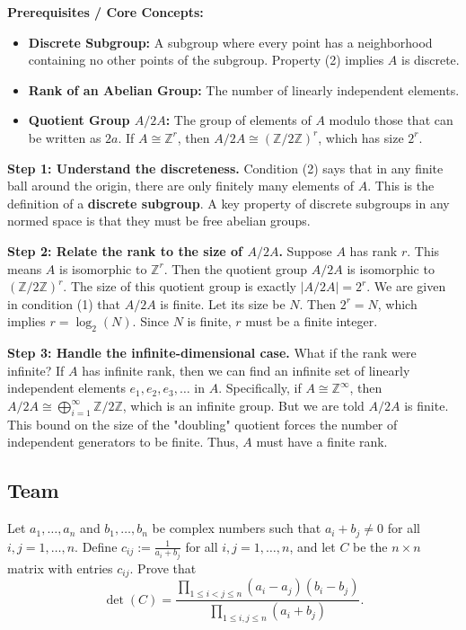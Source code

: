 \begin{solution}
\textbf{Prerequisites / Core Concepts:}
\begin{itemize}
    \item \textbf{Discrete Subgroup:} A subgroup where every point has a neighborhood containing no other points of the subgroup. Property (2) implies $A$ is discrete.
    \item \textbf{Rank of an Abelian Group:} The number of linearly independent elements.
    \item \textbf{Quotient Group $A/2A$:} The group of elements of $A$ modulo those that can be written as $2a$. If $A \cong \mathbb{Z}^r$, then $A/2A \cong (\mathbb{Z}/2\mathbb{Z})^r$, which has size $2^r$.
\end{itemize}

\textbf{Step 1: Understand the discreteness.}
Condition (2) says that in any finite ball around the origin, there are only finitely many elements of $A$. This is the definition of a \textbf{discrete subgroup}.
A key property of discrete subgroups in any normed space is that they must be free abelian groups. 

\textbf{Step 2: Relate the rank to the size of $A/2A$.}
Suppose $A$ has rank $r$. This means $A$ is isomorphic to $\mathbb{Z}^r$.
Then the quotient group $A/2A$ is isomorphic to $(\mathbb{Z}/2\mathbb{Z})^r$.
The size of this quotient group is exactly $|A/2A| = 2^r$.
We are given in condition (1) that $A/2A$ is finite. Let its size be $N$.
Then $2^r = N$, which implies $r = \log_2(N)$. 
Since $N$ is finite, $r$ must be a finite integer.

\textbf{Step 3: Handle the infinite-dimensional case.}
What if the rank were infinite?
If $A$ has infinite rank, then we can find an infinite set of linearly independent elements $e_1, e_2, e_3, \dots$ in $A$.
Specifically, if $A \cong \mathbb{Z}^\infty$, then $A/2A \cong \bigoplus_{i=1}^\infty \mathbb{Z}/2\mathbb{Z}$, which is an infinite group.
But we are told $A/2A$ is finite. This bound on the size of the "doubling" quotient forces the number of independent generators to be finite.
Thus, $A$ must have a finite rank.
\end{solution}

\subsection*{Team}
\begin{exercise}
\label{algebra:2012:7}
Let $a_1, \dots, a_n$ and $b_1, \dots, b_n$ be complex numbers such that $a_i + b_j \neq 0$ for all $i, j = 1, \dots, n$. Define $c_{ij} := \frac{1}{a_i + b_j}$ for all $i, j = 1, \dots, n$, and let $C$ be the $n \times n$ matrix with entries $c_{ij}$. Prove that
\[ \det(C) = \frac{\prod_{1 \leq i < j \leq n} (a_i - a_j)(b_i - b_j)}{\prod_{1 \leq i, j \leq n} (a_i + b_j)}. \]
\end{exercise}

